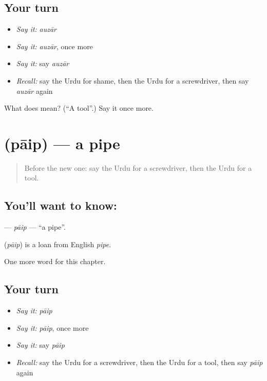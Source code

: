 \subsection*{Your turn}
\begin{itemize}
\raggedright
  \item \emph{Say it:} \emph{auzār}
  \item \emph{Say it:} \emph{auzār}, once more
  \item \emph{Say it:} say \emph{auzār}
  \item \emph{Recall:} say the Urdu for shame, then the Urdu for a screwdriver, then say \emph{auzār} again
\end{itemize}

\begin{tcolorbox}[breakable,colback=teal!4,colframe=teal!35!black,title={Before you move on}]
What does  mean? (\textquotedblleft{}A tool\textquotedblright{}.) Say it once more.
\end{tcolorbox}
\section[\texorpdfstring{\ur{پائپ} (pāip)}{پائپ (pāip)}]{ (pāip) — a pipe}

\label{lesson:UR-C258-paip}



\begin{quote}
Before the new one: say the Urdu for a screwdriver, then the Urdu for a tool.
\end{quote}

\subsection*{You'll want to know: }
\textbf{} — \emph{pāip} — \textquotedblleft{}a pipe\textquotedblright{}.

\begin{cousinweb}
\textbf{} (\emph{pāip}) is a loan from English \emph{pipe}.
\end{cousinweb}

\begin{grammarlens}[title={What you've built}]
One more word for this chapter.
\end{grammarlens}

\subsection*{Your turn}
\begin{itemize}
\raggedright
  \item \emph{Say it:} \emph{pāip}
  \item \emph{Say it:} \emph{pāip}, once more
  \item \emph{Say it:} say \emph{pāip}
  \item \emph{Recall:} say the Urdu for a screwdriver, then the Urdu for a tool, then say \emph{pāip} again
\end{itemize}


